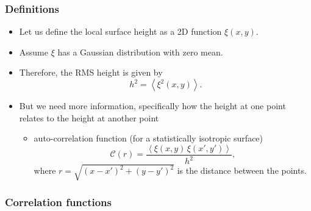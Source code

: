 \documentclass[11pt, oneside]{article}
\begin{document}
\subsubsection{Definitions}

\begin{itemize}
	\item Let us define the local surface height as a 2D function $\xi(x,y)$.
	\item Assume $\xi$ has a Gaussian distribution with zero mean.
	\item Therefore, the RMS height is given by
	\begin{equation}
		\label{e:h}
		h^2 = \left\langle\xi^2(x,y)\right\rangle.
	\end{equation}
	\item But we need more information, specifically how the height at one point relates to the height at another point
	\begin{itemize}
		\item[$\Rightarrow$] auto-correlation function (for a statistically isotropic surface)
		\begin{equation}
			\label{e:acf}
			\mathcal{C}(r) = \frac{\left\langle\xi(x,y)\,\xi(x',y')\right\rangle}{h^2},
		\end{equation}
		where $r = \sqrt{(x - x')^2 + (y - y')^2}$ is the distance between the points.
	\end{itemize}
\end{itemize}

\subsubsection{Correlation functions}
\end{document}
